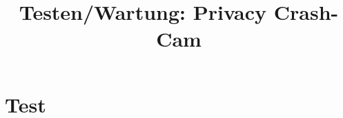 \documentclass[a4paper,twoside,BCOR=20mm]{scrreprt}
\title{Testen/Wartung: Privacy Crash- Cam}
\begin{document}

\tableofcontents


\newpage

\newpage

\newpage
\chapter{Test} \label{Test}

\newpage

\newpage

\newpage

\newpage

\newpage

\newpage


\end{document}
